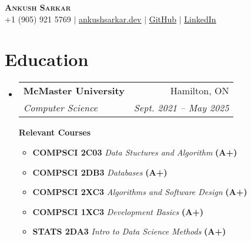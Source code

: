 \documentclass[a4paper,10pt]{article}
\makeatletter
\newcommand{\resumeSubheading}[4]{
  \vspace{-1pt}\item
    \begin{tabular*}{0.97\textwidth}[t]{l@{\extracolsep{\fill}}r}
      \textbf{#1} & #2 \\
      \textit{\normalsize#3} & \textit{\normalsize #4} \\
    \end{tabular*}\vspace{-7pt}
}
\newcommand{\resumeSubHeadingListStart}{\begin{itemize}[leftmargin=0.15in, label={}]}
\newcommand{\resumeSubHeadingListEnd}{\end{itemize}}
\makeatother
\begin{document}

\begin{center}
  \textbf{\Huge \scshape Ankush Sarkar} \\ \vspace{1pt}
  \small +1 (905) 921 5769 $|$ \href{https://www.ankushsarkar.dev/}{\underline{ankushsarkar.dev}} $|$
  \href{https://github.com/AnkushSarkar10}{\underline{GitHub}} $|$
  \href{https://www.linkedin.com/in/ankush-sarkar-a55a5b213/}{\underline{LinkedIn}}
\end{center}


\section{Education}
\resumeSubHeadingListStart
\resumeSubheading
{McMaster University}{Hamilton, ON}
{Computer Science}{Sept. 2021 -- May 2025}

\vspace{7pt}
\textbf{Relevant Courses}
\vspace{-5pt}
\begin{itemize}[leftmargin=0.15in, label={}]
  \item  \vspace{-1pt}  \textbf{COMPSCI 2C03} \textit{Data Stuctures and Algorithm}  \textbf{(A+)}
  \item  \vspace{-1pt}  \textbf{COMPSCI 2DB3} \textit{Databases}  \textbf{(A+)}
  \item  \vspace{-1pt}  \textbf{COMPSCI 2XC3} \textit{Algorithms and Software Design}  \textbf{(A+)}
  \item  \vspace{-1pt}  \textbf{COMPSCI 1XC3} \textit{Development Basics}  \textbf{(A+)}
  \item  \vspace{-1pt}  \textbf{STATS 2DA3} \textit{Intro to Data Science Methods}  \textbf{(A+)}
\end{itemize}
\vspace{-10pt}
\resumeSubHeadingListEnd
\end{document}
